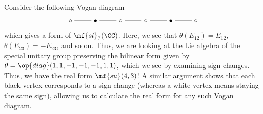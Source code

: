 \documentclass[../notes.tex]{subfiles}
\begin{document}
\begin{example} \label{ex:compute-form-from-vogan}
	Consider the following Vogan diagram
	\[\begin{tikzcd}[cramped]
		\circ & \bullet & \circ & \circ & \bullet & \circ
		\arrow[no head, from=1-1, to=1-2]
		\arrow[no head, from=1-2, to=1-3]
		\arrow[no head, from=1-3, to=1-4]
		\arrow[no head, from=1-4, to=1-5]
		\arrow[no head, from=1-5, to=1-6]
	\end{tikzcd}\]
	which gives a form of $\mf{sl}_7(\CC)$. Here, we see that $\theta(E_{12})=E_{12}$, $\theta(E_{23})=-E_{23}$, and so on. Thus, we are looking at the Lie algebra of the special unitary group preserving the bilinear form given by $\theta=\op{diag}(1,1,-1,-1,-1,1,1)$, which we see by examining sign changes. Thus, we have the real form $\mf{su}(4,3)$! A similar argument shows that each black vertex corresponds to a sign change (whereas a white vertex means staying the same sign), allowing us to calculate the real form for any such Vogan diagram.
\end{example}
\end{document}

